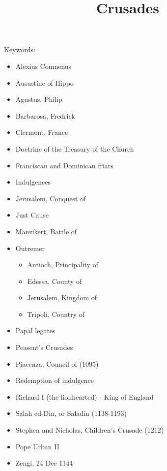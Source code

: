 \documentclass{article}
\begin{document}
\title{Crusades}
\maketitle
Keywords:
\begin{itemize}
	\item Alexius Comnenus
	\item Ausustine of Hippo
	\item Agustus, Philip
	\item Barbarosa, Fredrick
	\item Clermont, France
	\item Doctrine of the Treasury of the Church
	\item Franciscan and Dominican friars
	\item Indulgences
	\item Jerusalem, Conquest of
	\item Just Cause
	\item Manzikert, Battle of
	\item Outremer
	\begin{itemize}
		\item Antioch, Principality of
		\item Edessa, County of
		\item Jerusalem, Kingdom of
		\item Tripoli, Country of
	\end{itemize}
	\item Papal legates
	\item Peasent's Crusades
	\item Piacenza, Council of (1095)
	\item Redemption of indulgence
	\item Richard I (the lionhearted) - King of England
	\item Salah ed-Din, or Saladin (1138-1193)
	\item Stephen and Nicholas, Children's Crusade (1212)
	\item Pope Urban II
	\item Zengi, 24 Dec 1144
\end{itemize}
\end{document}
